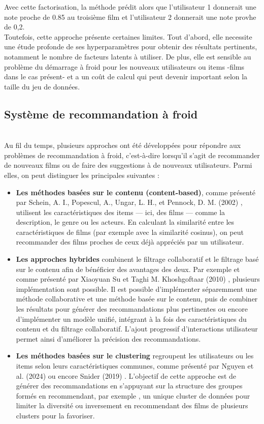 \documentclass{article}
\begin{document}
Avec cette factorisation, la méthode prédit alors que l'utilisateur 1 donnerait une note 
proche de 0.85 au troisième film et l'utilisateur 2 donnerait une note provhe de 0,2.\\
Toutefois, cette approche présente certaines limites. Tout d'abord, elle necessite une étude 
profonde de ses hyperparamètres pour obtenir des résultats pertinents, notamment le nombre de 
facteurs latents à utiliser. De plus, elle est sensible au problème du démarrage à froid pour 
les nouveaux utilisateurs ou items -films dans le cas présent- et a un coût de calcul qui peut 
devenir important selon la taille du jeu de données.

\subsection{Système de recommandation à froid}
$ $\\
Au fil du temps, plusieurs approches ont été développées pour répondre aux problèmes de recommandation à froid, 
c’est-à-dire lorsqu’il s’agit de recommander de nouveaux films ou de faire des suggestions à de nouveaux utilisateurs. 
Parmi elles, on peut distinguer les principales suivantes :
\begin{itemize}
    \item \textbf{Les méthodes basées sur le contenu (content-based)}, comme présenté par Schein, A. I., Popescul, A., Ungar, L. H., 
    et Pennock, D. M. (2002) \cite{schein2002_methods}, utilisent les caractéristiques des items — ici, 
    des films — comme la description, le genre ou les acteurs. En calculant la similarité entre les caractéristiques 
    de films (par exemple avec la similarité cosinus), on peut recommander des films proches de ceux déjà appréciés 
    par un utilisateur.
    \item \textbf{Les approches hybrides} combinent le filtrage collaboratif et le filtrage basé sur le contenu afin 
    de bénéficier des avantages des deux. Par exemple et comme présenté par Xiaoyuan Su et Taghi M. Khoshgoftaar (2010) \cite{su_cf_survey}, plusieurs implémentation sont possible. Il est possible 
    d'implémenter séparemment une méthode collaborative et une méthode basée sur le contenu, puis de combiner les résultats pour générer des recommandations 
    plus pertinentes ou encore d'implémenter un modèle unifié, intégrant à la fois des caractéristiques du contenu et du filtrage collaboratif.
    L’ajout progressif d’interactions utilisateur permet ainsi d’améliorer la précision des recommandations.
    \item \textbf{Les méthodes basées sur le clustering} regroupent les utilisateurs ou les items selon leurs caractéristiques 
    communes, comme présenté par Nguyen et al. (2024)\cite{nguyen2024_ere} ou encore Snider (2019) \cite{snider_unsupervised}.
    L'objectif de cette approche est de générer des recommandations en s’appuyant sur la structure des groupes formés en recommendant, par exemple ,
    un unique cluster de données pour limiter la diversité ou inversement en recommendant des films de plusieurs clusters pour la favoriser.
\end{itemize}
\end{document}

